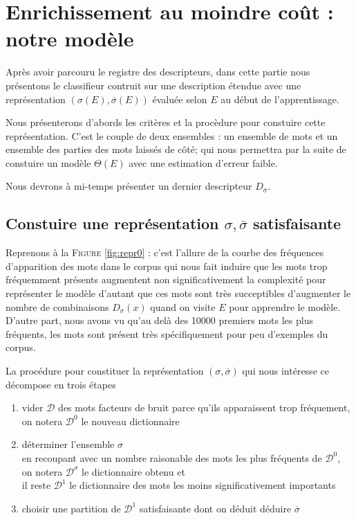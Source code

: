 \documentclass[a4paper, french]{article}
\begin{document}
\section{Enrichissement au moindre co\^ut : notre mod\`ele}

Apr\`es avoir parcouru le registre des descripteurs, dans cette partie
nous pr\'esentons le classifieur contruit sur une description \'etendue
avec une repr\'esentation $\left(\sigma(E),\overline\sigma(E)\right)$ \'evalu\'ee
selon $E$ au d\'ebut de l'apprentissage.

Nous pr\'esenterons d'abords les crit\`eres et la proc\`edure
pour constuire cette repr\'esentation. C'est le couple de deux ensembles :
un ensemble de mots et un ensemble des parties des mots laiss\'es de c\^ot\'e;
qui nous permettra par la suite de constuire
un mod\`ele $\Theta(E)$ avec une estimation d'erreur faible.

Nous devrons \`a mi-temps pr\'esenter un dernier descripteur
$D_{\overline\sigma}$.

\subsection{Constuire une repr\'esentation $\sigma, \overline\sigma$ satisfaisante}

Reprenons \`a la F\textsc{igure} \ref{fig:repr0} : c'est l'allure de la courbe
des fr\'equences d'apparition des mots dans le corpus qui nous fait induire
que les mots trop fr\'equemment pr\'esents augmentent non significativement
la complexit\'e pour repr\'esenter le mod\`ele d'autant que ces mots sont tr\`es
succeptibles d'augmenter le nombre de combinaisons $D_\sigma(x)$ quand on visite
$E$ pour apprendre le mod\`ele. D'autre part, nous avons vu qu'au del\`a
des 10000 premiers mots les plus fr\'equents, les mots sont pr\'esent
tr\`es sp\'ecifiquement pour peu d'exemples du corpus.

La proc\'edure pour constituer la repr\'esentation $(\sigma,\overline\sigma)$
qui nous int\'eresse ce d\'ecompose en trois \'etapes

\begin{enumerate}
  \item vider $\mathcal{D}$ des mots facteurs de bruit parce qu'ils
  apparaissent trop fr\'equement,\\
  on notera $\mathcal{D}^0$ le nouveau dictionnaire
  \item d\'eterminer l'ensemble $\sigma$\\ en recoupant avec un nombre
  raisonable des mots les plus fr\'equents de $\mathcal{D}^0$,\\
  on notera $\mathcal{D}^{\sigma}$ le dictionnaire obtenu et\\ il reste
  $\mathcal{D}^1$ le dictionnaire des mots les moins significativement
  importants
  \item choisir une partition de $\mathcal{D}^1$ satisfaisante dont on
  d\'eduit  d\'eduire $\overline\sigma$
\end{enumerate}
\end{document}
